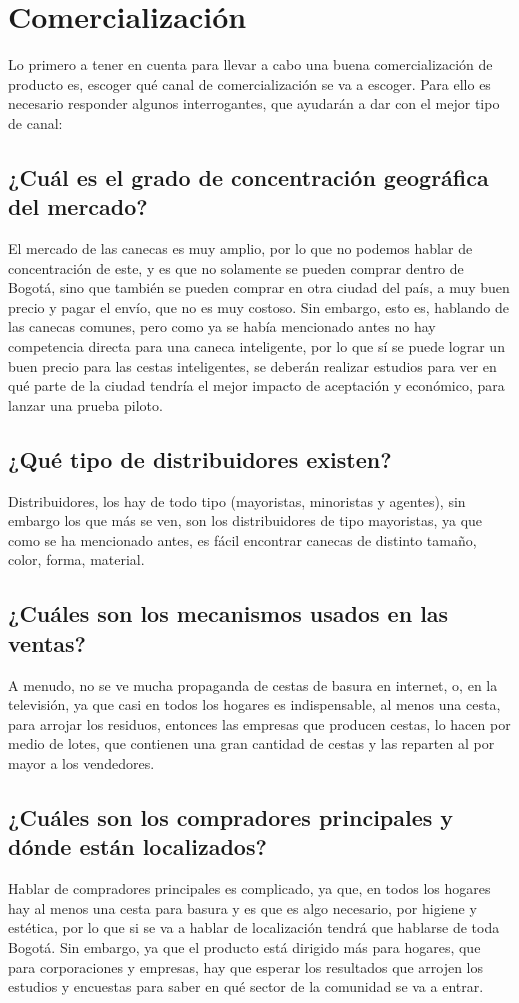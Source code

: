 \documentclass[letterpaper,12pt]{scrreprt}
\begin{document}
\chapter{Comercialización}
    Lo primero a tener en cuenta para llevar a cabo una buena comercialización de producto es, escoger qué canal de comercialización se va a escoger. Para ello es necesario responder algunos interrogantes, que ayudarán a dar con el mejor tipo de canal:

    \section{¿Cuál es el grado de concentración geográfica del mercado?}
    El mercado de las canecas es muy amplio, por lo que no podemos hablar de concentración de este, y es que no solamente se pueden comprar dentro de Bogotá, sino que también se pueden comprar en otra ciudad del país, a muy buen precio y pagar el envío, que no es muy costoso. Sin embargo, esto es, hablando de las canecas comunes, pero como ya se había mencionado antes no hay competencia directa para una caneca inteligente, por lo que sí se puede lograr un buen precio para las cestas inteligentes, se deberán realizar estudios para ver en qué parte de la ciudad tendría el mejor impacto de aceptación y económico, para lanzar una prueba piloto.

    \section{¿Qué tipo de distribuidores existen?}
    Distribuidores, los hay de todo tipo (mayoristas, minoristas y agentes), sin embargo los que más se ven, son los distribuidores de tipo mayoristas, ya que como se ha mencionado antes, es fácil encontrar canecas de distinto tamaño, color, forma, material.

    \section{¿Cuáles son los mecanismos usados en las ventas?}
    A menudo, no se ve mucha propaganda de cestas de basura en internet, o, en la televisión, ya que casi en todos los hogares es indispensable, al menos una cesta, para arrojar los residuos, entonces las empresas que producen cestas, lo hacen por medio de lotes, que contienen una gran cantidad de cestas y las reparten al por mayor a los vendedores.

    \section{¿Cuáles son los compradores principales y dónde están localizados?}
    Hablar de compradores principales es complicado, ya que, en todos los hogares hay al menos una cesta para basura y es que es algo necesario, por higiene y estética, por lo que si se va a hablar de localización tendrá que hablarse de toda Bogotá. Sin embargo, ya que el producto está dirigido más para hogares, que para corporaciones y empresas, hay que esperar los resultados que arrojen los estudios y encuestas para saber en qué sector de la comunidad se va a entrar.
\end{document}
